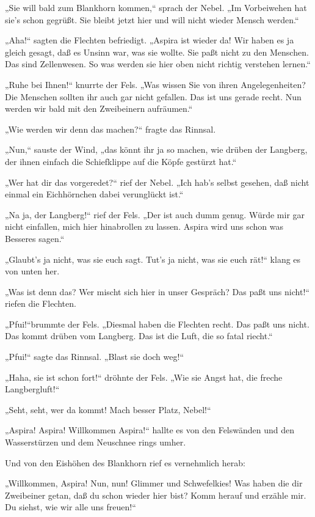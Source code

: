 „Sie will bald zum Blankhorn kommen,“ sprach der Nebel. „Im
Vorbeiwehen hat sie's schon gegrüßt. Sie bleibt jetzt hier und will
nicht wieder Mensch werden.“

„Aha!“ sagten die Flechten befriedigt. „Aspira ist wieder da! Wir
haben es ja gleich gesagt, daß es Unsinn war, was sie wollte. Sie
paßt nicht zu den Menschen. Das sind Zellenwesen. So was werden sie
hier oben nicht richtig verstehen lernen.“

„Ruhe bei Ihnen!“ knurrte der Fels. „Was wissen Sie von ihren
Angelegenheiten? Die Menschen sollten ihr auch gar nicht gefallen.
Das ist uns gerade recht. Nun werden wir bald mit den Zweibeinern
aufräumen.“

„Wie werden wir denn das machen?“ fragte das Rinnsal.

„Nun,“ sauste der Wind, „das könnt ihr ja so machen, wie drüben der
Langberg, der ihnen einfach die Schiefklippe auf die Köpfe gestürzt
hat.“

„Wer hat dir das vorgeredet?“ rief der Nebel. „Ich hab's selbst
gesehen, daß nicht einmal ein Eichhörnchen dabei verunglückt ist.“

„Na ja, der Langberg!“ rief der Fels. „Der ist auch dumm genug.
Würde mir gar nicht einfallen, mich hier hinabrollen zu lassen.
Aspira wird uns schon was Besseres sagen.“

„Glaubt's ja nicht, was sie euch sagt. Tut's ja nicht, was sie euch
rät!“ klang es von unten her.

„Was ist denn das? Wer mischt sich hier in unser Gespräch? Das paßt
uns nicht!“ riefen die Flechten.

„Pfui!“brummte der Fels. „Diesmal haben die Flechten recht. Das
paßt uns nicht. Das kommt drüben vom Langberg. Das ist die Luft,
die so fatal riecht.“

„Pfui!“ sagte das Rinnsal. „Blast sie doch weg!“

„Haha, sie ist schon fort!“ dröhnte der Fels. „Wie sie Angst hat,
die freche Langbergluft!“

„Seht, seht, wer da kommt! Mach besser Platz, Nebel!“

„Aspira! Aspira! Willkommen Aspira!“ hallte es von den Felswänden
und den Wasserstürzen und dem Neuschnee rings umher.

Und von den Eishöhen des Blankhorn rief es vernehmlich herab:

„Willkommen, Aspira! Nun, nun! Glimmer und Schwefelkies! Was haben
die dir Zweibeiner getan, daß du schon wieder hier bist? Komm
herauf und erzähle mir. Du siehst, wie wir alle uns freuen!“

